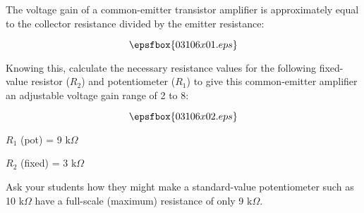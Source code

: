 

The voltage gain of a common-emitter transistor amplifier is approximately equal to the collector resistance divided by the emitter resistance:

$$\epsfbox{03106x01.eps}$$

Knowing this, calculate the necessary resistance values for the following fixed-value resistor ($R_2$) and potentiometer ($R_1$) to give this common-emitter amplifier an adjustable voltage gain range of 2 to 8:

$$\epsfbox{03106x02.eps}$$







$R_1$ (pot) = 9 k$\Omega$

\vskip 10pt

$R_2$ (fixed) = 3 k$\Omega$







Ask your students how they might make a standard-value potentiometer such as 10 k$\Omega$ have a full-scale (maximum) resistance of only 9 k$\Omega$.




